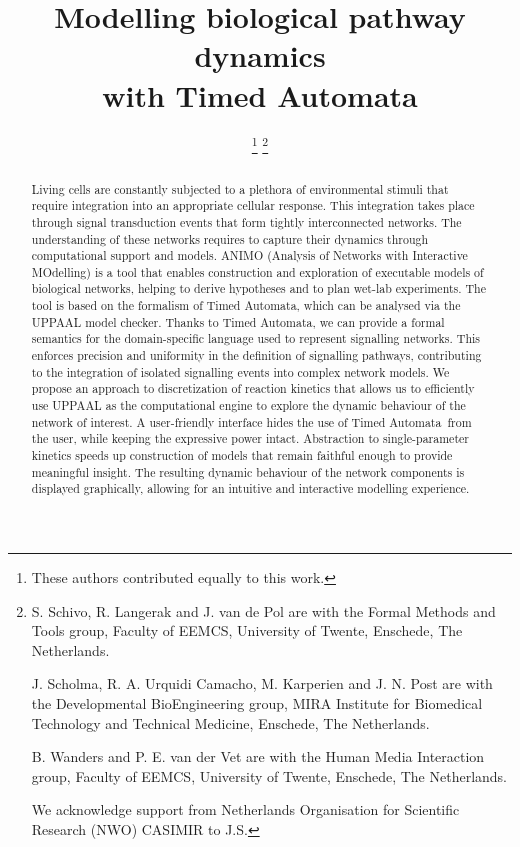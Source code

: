 \documentclass[journal, 10pt]{IEEEtran}
\def\tas{Timed Automata}
\begin{document}
\title{Modelling biological pathway dynamics\\with \tas}


\author{
%
\thanks{These authors contributed equally to this work.}%
\thanks{S. Schivo, R. Langerak and J. van de Pol are with the Formal Methods and Tools group,
Faculty of EEMCS, University of Twente, Enschede, The Netherlands.

J. Scholma, R. A. Urquidi Camacho, M. Karperien and J. N. Post are with the Developmental BioEngineering group,
MIRA Institute for Biomedical Technology and Technical Medicine, Enschede, The Netherlands.

B. Wanders and P. E. van der Vet are with the Human Media Interaction group,
Faculty of EEMCS, University of Twente, Enschede, The Netherlands.

We acknowledge support from Netherlands Organisation for Scientific Research (NWO) CASIMIR to J.S.}%
}

\maketitle


\begin{abstract}
Living cells are constantly subjected to a plethora of environmental stimuli that require integration into an appropriate cellular response. 
This integration takes place through signal transduction events that form tightly interconnected networks. The understanding of these networks requires
to capture their dynamics through computational support and models.
ANIMO (Analysis of Networks with Interactive MOdelling) is a tool that enables construction and exploration of executable models 
of biological networks, helping to derive hypotheses and to plan wet-lab experiments.
The tool is based on the formalism of \tas, which can be analysed via
the UPPAAL model checker.
Thanks to \tas, we can provide a formal semantics for the domain-specific language used to represent signalling networks.
This enforces precision and uniformity in the definition of signalling pathways,
contributing to the integration of isolated signalling events into complex network models.
We propose an approach to discretization of reaction kinetics that allows us to efficiently use UPPAAL
as the computational engine to explore the dynamic behaviour of the network of interest.
A user-friendly interface hides the use of \tas\ from the user, while keeping the expressive power intact. 
Abstraction to single-parameter kinetics speeds up construction of models
that remain faithful enough to provide meaningful insight. The resulting dynamic behaviour of the network components 
is displayed graphically, allowing for an intuitive and interactive modelling experience.
\end{abstract}
\end{document}
